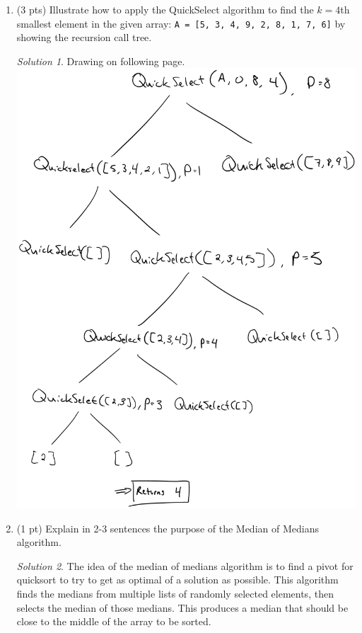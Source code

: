 \documentclass[12pt]{article}
\theoremstyle{remark}
\newtheorem*{solution}{Solution}
\begin{document}
\begin{enumerate}
\item (3 pts) Illustrate how to apply the QuickSelect algorithm to find the $k = 4$th smallest element in the given array: \texttt{A = [5, 3, 4, 9, 2, 8, 1, 7, 6]} by showing the recursion call tree.
\begin{solution} Drawing on following page. \\
\includegraphics[scale=0.7]{PS8a-Q2.png}
\end{solution}
\pagebreak
\item (1 pt) Explain in 2-3 sentences the purpose of the Median of Medians algorithm.
\begin{solution}
The idea of the median of medians algorithm is to find a pivot for quicksort to try to get as optimal of a solution as possible. This algorithm finds the medians from multiple lists of randomly selected elements, then selects the median of those medians. This produces a median that should be close to the middle of the array to be sorted.
\end{solution}


\end{enumerate}
\end{document}
